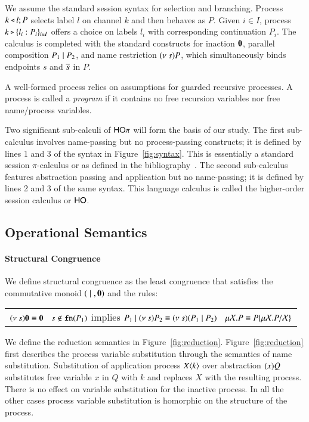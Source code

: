 We assume the standard session syntax for selection and branching. Process
$k \triangleleft l ; P$ selects label $l$ on channel $k$ and then behaves as $P$. 
Given $i \in I$, 
process 
$k \triangleright \{l_i:P_i\}_{i \in I}$ offers a choice on labels $l_i$ with
corresponding continuation $P_i$.
The calculus is completed with the standard constructs for 
inaction $\mathbf{0}$, 
parallel composition $P_1 \;|\; P_2$, and 
name restriction $(\nu\ s) P$, which simultaneously binds endpoints $s$ and $\overline{s}$ in $P$.

A well-formed process relies on assumptions for guarded recursive processes.
A process is called a \emph{program} if it contains 
no free recursion variables nor free name/process variables.



Two significant sub-calculi of $\mathsf{HO}\pi$ will form the basis of our study.
The first sub-calculus involves name-passing but no process-passing constructs; it is 
defined by lines 1 and 3 of the syntax in Figure~\ref{fig:syntax}.
This is essentially a standard session $\pi$-calculus 
or \sesp as defined in the bibliography~\cite{}.
The second sub-calculus features abstraction passing and application but no name-passing; 
it is defined by lines 2 and 3 of the same syntax. This language 
calculus is called the higher-order session calculus or $\mathsf{HO}$.


\subsection{Operational Semantics}

\paragraph{Structural Congruence}

We define structural congruence as the least congruence that satisfies the commutative monoid $(\;|\;, \mathbf{0})$
and the rules:

\begin{tabular}{c}
	$(\nu\ s) \mathbf{0} \equiv \mathbf{0} \quad
	s \notin \mathtt{fn}(P_1)$ implies $P_1 \;|\; (\nu\ s) P_2 \equiv (\nu\ s)(P_1 \;|\; P_2)
	\quad \mu \mathcal{X}. P \equiv P\{\mu \mathcal{X}. P/\mathcal{X} \}$
\end{tabular}


We define the reduction semantics in Figure~\ref{fig:reduction}.
Figure~\ref{fig:reduction} first describes the process variable
substitution through the semantics
of name substitution. Substitution of application process $X\langle k \rangle$
over abstraction $(x)Q$ substitutes free variable
$x$ in $Q$ with $k$ and replaces $X$ with the resulting process.
There is no effect on variable substitution for the inactive process.
In all the other cases process variable substitution is homorphic 
on the structure of the process.

